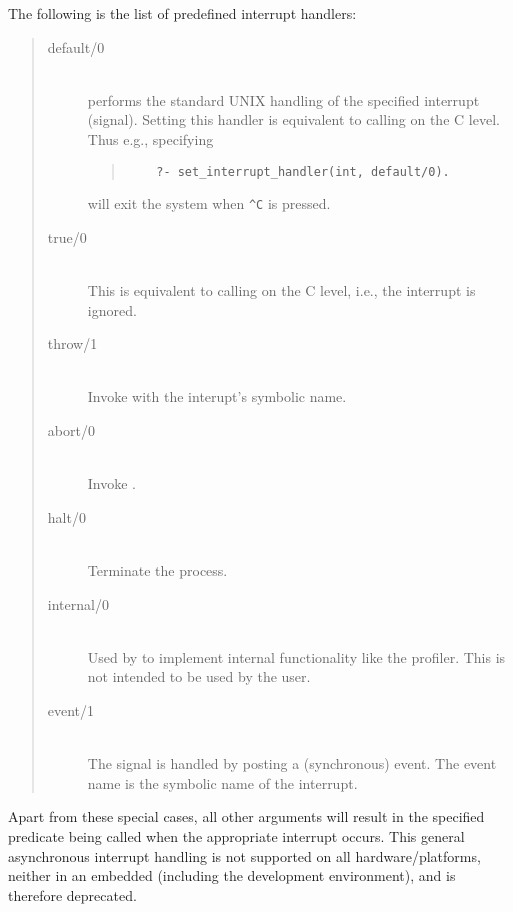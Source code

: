 The following is the list of predefined interrupt handlers:
\begin{quote}
\begin{description}
\item[default/0]\mbox{}\\
performs the standard UNIX handling of the specified interrupt (signal).
    Setting this handler is equivalent to calling 
    on the C level.
    Thus e.g., specifying
    \begin{quote}
    \begin{verbatim}
    ?- set_interrupt_handler(int, default/0).
    \end{verbatim}
    \end{quote}
    will exit the {\eclipse} system when \verb:^C: is pressed.

\item[true/0]\mbox{}\\
    This is equivalent to calling  on the C level,
    i.e., the interrupt is ignored.

\item[throw/1]\mbox{}\\
    Invoke  with the interupt's symbolic name.

\item[abort/0]\mbox{}\\
    Invoke .

\item[halt/0]\mbox{}\\
    Terminate the {\eclipse} process.

\item[internal/0]\mbox{}\\
    Used by {\eclipse} to implement internal functionality like the
    profiler. This is not intended to be used by the user.

\item[event/1]\mbox{}\\
    The signal is handled by posting a (synchronous) event. The event
    name is the symbolic name of the interrupt.
\end{description}
\end{quote}
Apart from these special cases, all other arguments will
result in the specified predicate being called when the appropriate
interrupt occurs. This general asynchronous interrupt handling
is not supported on all hardware/platforms,
neither in an embedded {\eclipse} (including the
 \tkeclipse{} development environment),
and is therefore deprecated.


